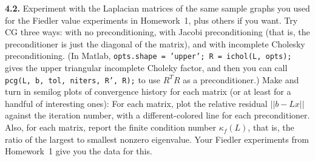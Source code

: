 \documentclass[11pt]{article}
\begin{document}
\par\medskip
{\bf 4.2.}
Experiment with the Laplacian matrices of the same sample graphs you
used for the Fiedler value experiments in Homework~1, plus others if you want.
Try CG three ways:  with no preconditioning, with Jacobi preconditioning
(that is, the preconditioner is just the diagonal of the matrix), and
with incomplete Cholesky preconditioning.
(In Matlab, {\tt opts.shape = 'upper'; R = ichol(L, opts);} 
gives the upper triangular incomplete Choleky factor, and then
you can call {\tt pcg(L, b, tol, niters, R', R);} 
to use $R^TR$ as a preconditioner.)
Make and turn in semilog plots of convergence history for each matrix
(or at least for a handful of interesting ones):
For each matrix, plot the relative residual $||b-Lx||$ against the 
iteration number, with a different-colored line for each preconditioner.
Also, for each matrix, report the finite condition number $\kappa_f(L)$, 
that is, the ratio of the largest to smallest nonzero eigenvalue.  
Your Fiedler experiments from Homework~1 give you the data for this.
\end{document}
